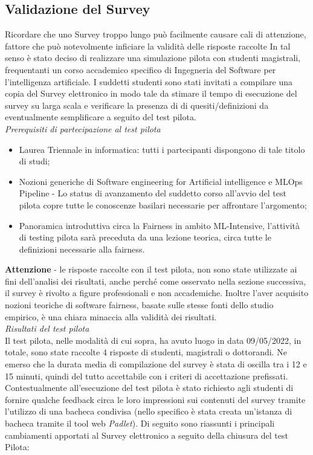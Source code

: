    



    \subsection{Validazione del Survey}
    
    Ricordare che uno Survey troppo lungo può facilmente causare cali di attenzione, fattore che può notevolmente inficiare la validità delle risposte raccolte\cite{andrews2007conducting}
    In tal senso è stato deciso di realizzare una simulazione pilota con studenti magistrali, frequentanti un corso accademico specifico di Ingegneria del Software per l'intelligenza artificiale. I suddetti studenti sono stati invitati a compilare una copia del Survey elettronico in modo tale da stimare il tempo di esecuzione del survey su larga scala e verificare la presenza di di quesiti/definizioni da eventualmente semplificare a seguito del test pilota.\\
    
    \emph{Prerequisiti di partecipazione al test pilota}
    \begin{itemize}
        \item Laurea Triennale in informatica: tutti i partecipanti dispongono di tale titolo di studi;
        \item Nozioni generiche di Software engineering for Artificial intelligence e MLOps Pipeline - Lo status di avanzamento del suddetto corso all'avvio del test pilota copre tutte le conoscenze basilari necessarie per affrontare l'argomento;
        \item Panoramica introduttiva circa la Fairness in ambito ML-Intensive, l'attività di testing pilota sarà preceduta da una lezione teorica, circa tutte le definizioni necessarie alla fairness.
    \end{itemize}
    
   \textbf{ Attenzione } - le risposte raccolte con il test pilota, non sono state utilizzate ai fini dell'analisi dei risultati, anche perché come osservato nella sezione successiva, il survey è rivolto a figure professionali e non accademiche. Inoltre l'aver acquisito nozioni teoriche di software fairness, basate sulle stesse fonti dello studio empirico, è una chiara minaccia alla validità dei risultati.\\
   
   \emph{Risultati del test pilota}\\
   Il test pilota, nelle modalità di cui sopra, ha avuto luogo in data 09/05/2022, in totale, sono state raccolte 4 risposte di studenti, magistrali o dottorandi. Ne emerso che la durata media di compilazione del survey è stata di oscilla tra i 12 e 15 minuti, quindi del tutto accettabile con i criteri di accettazione prefissati. Contestualmente all'esecuzione del test pilota è stato richiesto agli studenti di fornire qualche feedback circa le loro impressioni sui contenuti del survey tramite l'utilizzo di una bacheca condivisa (nello specifico è stata creata un'istanza di bacheca tramite il tool web \emph{Padlet}). Di seguito sono riassunti i principali cambiamenti apportati al Survey elettronico a seguito della chiusura del test Pilota:\\
   
